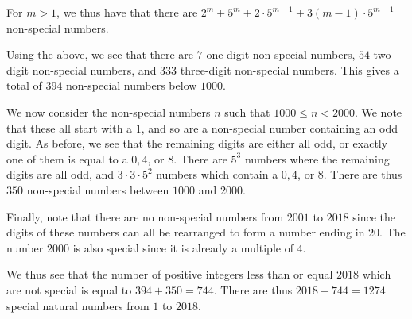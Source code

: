 \documentclass[a4paper, 12pt]{article}
\begin{document}
\begin{enumerate}
For $m > 1$, we thus have that there are $2^m + 5^m + 2 \cdot 5^{m-1} + 3(m-1) \cdot 5^{m-1}$ non-special numbers.

Using the above, we see that there are $7$ one-digit non-special numbers, $54$ two-digit non-special numbers, and $333$ three-digit non-special numbers. This gives a total of $394$ non-special numbers below $1000$.

We now consider the non-special numbers $n$ such that $1000 \leq n < 2000$. We note that these all start with a $1$, and so are a non-special number containing an odd digit. As before, we see that the remaining digits are either all odd, or exactly one of them is equal to a $0, 4$, or $8$. There are $5^3$ numbers where the remaining digits are all odd, and $3 \cdot 3 \cdot 5^2$ numbers which contain a $0, 4$, or $8$. There are thus $350$ non-special numbers between $1000$ and $2000$.

Finally, note that there are no non-special numbers from $2001$ to $2018$ since the digits of these numbers can all be rearranged to form a number ending in $20$. The number $2000$ is also special since it is already a multiple of $4$.

We thus see that the number of positive integers less than or equal $2018$ which are not special is equal to $394 + 350 = 744$. There are thus $2018 - 744 = 1274$ special natural numbers from $1$ to $2018$.


\end{enumerate}

\vfill

\centering

\vspace{12mm}
\end{document}
